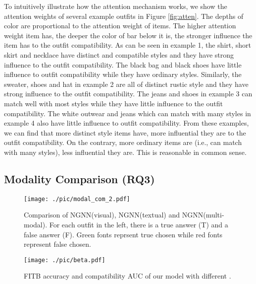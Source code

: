 \documentclass[sigconf]{acmart}
\begin{document}
To intuitively illustrate how the attention mechanism works, we show the attention weights of several example outfits in Figure \ref{fig:atten}. The depths of color are proportional to the attention weight of items. The higher attention weight item has, the deeper the color of bar below it is, the stronger influence the item has to the outfit compatibility.
As can be seen in example 1, the shirt, short skirt and necklace have distinct and compatible styles and they have strong influence to the outfit compatibility. The black bag and black shoes have little influence to outfit compatibility while they have ordinary styles. Similarly, the sweater, shoes and hat in example 2 are all of distinct rustic style and they have strong influence to the outfit compatibility. The jeans and shoes in example 3 can match well with most styles while they have little influence to the outfit compatibility. The white outwear and jeans which can match with many styles in example 4 also have little influence to outfit compatibility.
From these examples, we can find that more distinct style items have, more influential they are to the outfit compatibility. On the contrary, more ordinary items are (i.e., can match with many styles), less influential they are. This is reasonable in common sense. 


\subsection{Modality Comparison (RQ3)}

 \begin{figure*}[t]
  \centering
\texttt{[image: ./pic/modal\_com\_2.pdf]}
  \caption{Comparison of NGNN(visual), NGNN(textual) and NGNN(multi-modal). For each outfit in the left, there is a true answer (T) and a false answer (F). Green fonts reprsent true chosen while red fonts represent false chosen.}
  \label{fig:modal_compare}
\end{figure*}

\begin{figure}[hbtp]
  \centering
  \vspace{1.0em}
\texttt{[image: ./pic/beta.pdf]}

  \caption{FITB accuracy and compatibility AUC of our model with different .}
  \vspace{1.0em}
  \label{fig:beta}
\end{figure}
\end{document}
